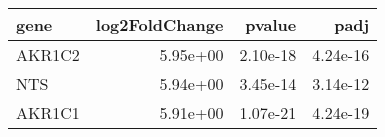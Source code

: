 \begin{tabular}{lrrr}
\toprule
  gene &  log2FoldChange &   pvalue &     padj \\
\midrule
AKR1C2 &        5.95e+00 & 2.10e-18 & 4.24e-16 \\
   NTS &        5.94e+00 & 3.45e-14 & 3.14e-12 \\
AKR1C1 &        5.91e+00 & 1.07e-21 & 4.24e-19 \\
\bottomrule
\end{tabular}
